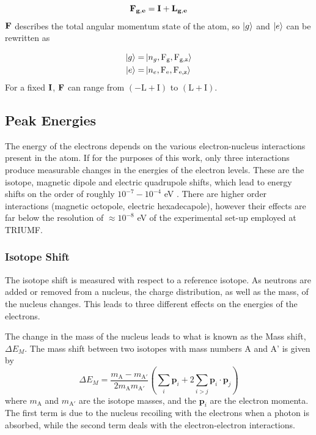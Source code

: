 \begin{equation}
\bf{F_{g,e}} = \bf{I} + \bf{L_{g,e}}
\end{equation}
$\bf{F}$ describes the total angular momentum state of the atom, so $\ket{g}$ and $\ket{e}$ can be rewritten as

\begin{align}
\ket{g} =& \ket{n_g,\mathrm{F_g, F_{g,z}}}\\
\ket{e} =& \ket{n_e,\mathrm{F_e, F_{e,z}}}
\end{align}
For a fixed $\bf{I}$, $\bf{F}$ can range from $(-\mathrm{L+I})$ to $(\mathrm{L+I})$.
\subsection{Peak Energies}
The energy of the electrons depends on the various electron-nucleus interactions present in the atom. If for the purposes of this work, only three interactions produce measurable changes in the energies of the electron levels. These are the isotope, magnetic dipole and electric quadrupole shifts, which lead to energy shifts on the order of roughly $10^{-7}-10^{-4}$ eV \cite{ModAN}. There are higher order interactions (magnetic octopole, electric hexadecapole), however their effects are far below the resolution of $\approx 10^{-8}$ eV of the experimental set-up employed at TRIUMF.\cite{GA69}

\subsubsection{Isotope Shift}
The isotope shift is measured with respect to a reference isotope. As neutrons are added or removed from a nucleus, the charge distribution, as well as the mass, of the nucleus changes. This leads to three different effects on the energies of the electrons. 

The change in the mass of the nucleus leads to what is known as the Mass shift, $\Delta E_M$. The mass shift between two isotopes with mass numbers A and A' is given by
\begin{equation}
\Delta E_M = \frac{m_{\mathrm{A}}-m_{\mathrm{A'}}}{2 m_{\mathrm{A}} m_{\mathrm{A'}}} \left(\sum_i\mathrm{\textbf{p}}_i +2 \sum_{i>j}\mathrm{\textbf{p}}_i \cdot \mathrm{\textbf{p}}_j \right)
\end{equation}
where $m_{\mathrm{A}}$ and $m_{\mathrm{A'}}$ are the isotope masses, and the $\textbf{p}_i$ are the electron momenta. The first term is due to the nucleus recoiling with the electrons when a photon is absorbed, while the second term deals with the electron-electron interactions.  

